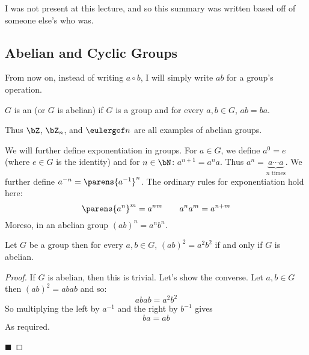 \documentclass[10pt]{article}
\begin{document}


\bigskip

\begin{note}

    I was not present at this lecture, and so this summary was written based off of someone else's who was.

\end{note}

\subsection{Abelian and Cyclic Groups}

From now on, instead of writing $a\circ b$, I will simply write $ab$ for a group's operation.

\begin{defn*}

    $G$ is an  (or $G$ is abelian) if $G$ is a group and for every $a,b\in G$, $ab=ba$.

\end{defn*}

Thus $\bZ$, $\bZ_n$, and $\eulergof n$ are all examples of abelian groups.

We will further define exponentiation in groups.
For $a\in G$, we define $a^0=e$ (where $e\in G$ is the identity) and for $n\in\bN$: $a^{n+1} = a^na$.
Thus $a^n=\underbrace{a\cdots a}_{n\text{ times}}$.
We further define $a^{-n}=\parens{a^{-1}}^n$.
The ordinary rules for exponentiation hold here:
\[ \parens{a^n}^m = a^{nm} \qquad a^na^m = a^{n+m} \]
Moreso, in an abelian group $(ab)^n=a^nb^n$.

\begin{prop*}

    Let $G$ be a group then for every $a,b\in G$, $(ab)^2=a^2b^2$ if and only if $G$ is abelian.

\end{prop*}

\begin{proof}

    If $G$ is abelian, then this is trivial.
    Let's show the converse.
    Let $a,b\in G$ then $(ab)^2=abab$ and so:
        \[ abab = a^2b^2 \]
    So multiplying the left by $a^{-1}$ and the right by $b^{-1}$ gives
        \[ ba = ab \]
    As required.

    \hfill$\blacksquare$

\end{proof}
\end{document}
